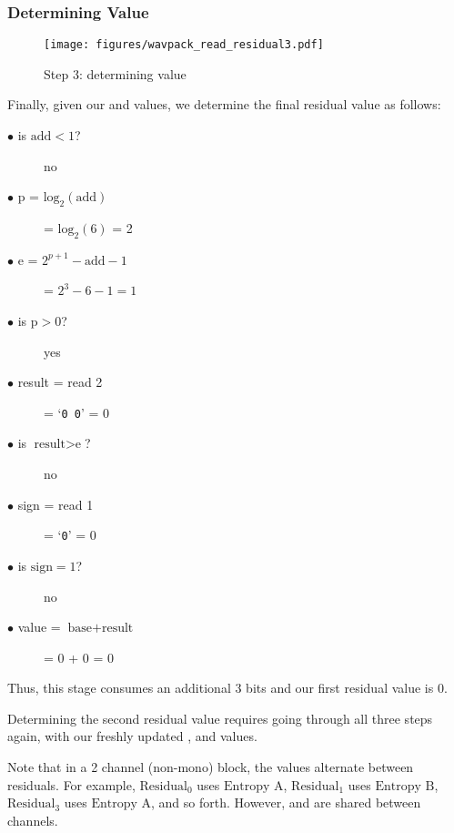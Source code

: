 \clearpage

\subsubsection{Determining Value}
\begin{wrapfigure}[30]{r}{3in}
\texttt{[image: figures/wavpack\_read\_residual3.pdf]}
\caption{Step 3: determining value}
\end{wrapfigure}
Finally, given our  and  values, we
determine the final residual value as follows:
\begin{description}
\item[$\bullet$ is $\text{add} < 1$?] no
\item[$\bullet$ p = $\text{log}_2(\text{add})$] = $\text{log}_2(6)$ = 2
\item[$\bullet$ e = $2 ^ {p + 1} - \text{add} - 1$] = $2 ^ 3 - 6 - 1 = 1$
\item[$\bullet$ is $\text{p} > 0$?] yes
\item[$\bullet$ result = read 2] = `\texttt{0 0}' = 0
\item[$\bullet$ is $\text{result} > \text{e}$?] no
\item[$\bullet$ sign = read 1] = `\texttt{0}' = 0
\item[$\bullet$ is $\text{sign} = 1$?] no
\item[$\bullet$ value = $\text{base} + \text{result}$] = 0 + 0 = 0
\end{description}
Thus, this stage consumes an additional 3 bits and our first residual
value is 0.

Determining the second residual value requires going through all
three steps again, with our freshly updated ,
 and  values.

Note that in a 2 channel (non-mono) block,
the  values alternate between residuals.
For example,
$\text{Residual}_0$ uses $\text{Entropy A}$,
$\text{Residual}_1$ uses $\text{Entropy B}$,
$\text{Residual}_3$ uses $\text{Entropy A}$, and so forth.
However,  and  are shared
between channels.

\clearpage

